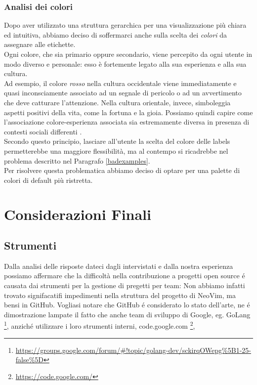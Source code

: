 \documentclass[12pt]{article} %
\begin{document}
\subsubsection{Analisi dei colori}
Dopo aver utilizzato una struttura gerarchica per una visualizzazione più chiara ed intuitiva, abbiamo deciso di soffermarci anche sulla scelta dei \emph{colori} da assegnare alle etichette.\\
Ogni colore, che sia primario oppure secondario, viene percepito da ogni utente in modo diverso e personale: esso è fortemente legato alla sua esperienza e alla sua cultura.\\
Ad esempio, il colore \emph{rosso} nella cultura occidentale viene immediatamente e quasi inconsciamente associato ad un segnale di pericolo o ad un avvertimento che deve catturare l'attenzione. Nella cultura orientale, invece, simboleggia aspetti positivi della vita, come la fortuna e la gioia. Possiamo quindi capire come l'associazione colore-esperienza associata sia estremamente diversa in presenza di contesti sociali differenti \cite{thesis}.\\
Secondo questo principio, lasciare all'utente la scelta del colore delle labels permetterebbe una maggiore flessibilità, ma al contempo si ricadrebbe nel problema descritto nel Paragrafo \ref{badexamples}.\\
Per risolvere questa problematica abbiamo deciso di optare per una palette di colori di default più ristretta.




\newpage
\section{Considerazioni Finali}

\subsection{Strumenti}
Dalla analisi delle risposte dateci dagli intervistati e dalla nostra esperienza possiamo affermare che la difficolt\`a nella contribuzione a progetti open source \'e causata dai strumenti per la gestione di pregetti per team:
Non abbiamo infatti trovato signifacatifi impedimenti nella struttura del progetto di NeoVim, ma bensi in GitHub.
Vogliasi notare che GitHub \'e considerato lo stato dell'arte, ne \'e dimostrazione lampate il fatto che anche team di sviluppo di Google, eg. GoLang \footnote{\url{https://groups.google.com/forum/#!topic/golang-dev/sckirqOWepg\%5B1-25-false\%5D}}, anzich\'e utilizzare i loro strumenti interni, code.google.com \footnote{\url{https://code.google.com/}}, 



\cite{*}

\newpage


\end{document}
